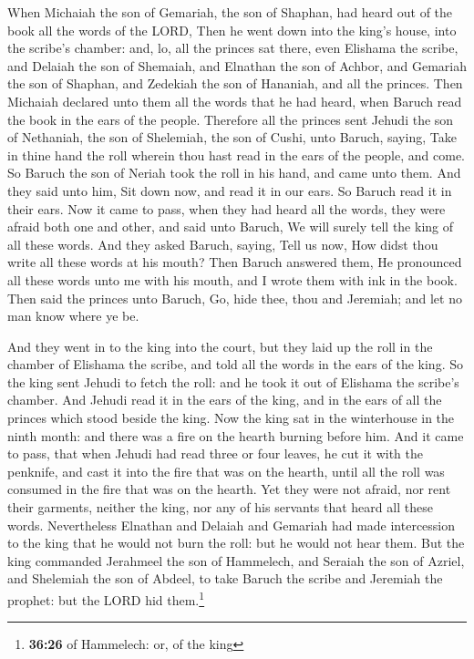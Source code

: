  When Michaiah the son of Gemariah, the son of Shaphan,
had heard out of the book all the words of the LORD, 
Then he went down into the king's house, into the scribe's chamber: and,
lo, all the princes sat there, even Elishama the scribe, and Delaiah the
son of Shemaiah, and Elnathan the son of Achbor, and Gemariah the son of
Shaphan, and Zedekiah the son of Hananiah, and all the princes.
 Then Michaiah declared unto them all the words that he
had heard, when Baruch read the book in the ears of the people.
 Therefore all the princes sent Jehudi the son of
Nethaniah, the son of Shelemiah, the son of Cushi, unto Baruch, saying,
Take in thine hand the roll wherein thou hast read in the ears of the
people, and come. So Baruch the son of Neriah took the roll in his hand,
and came unto them.  And they said unto him, Sit down
now, and read it in our ears. So Baruch read it in their ears.
 Now it came to pass, when they had heard all the words,
they were afraid both one and other, and said unto Baruch, We will
surely tell the king of all these words.  And they asked
Baruch, saying, Tell us now, How didst thou write all these words at his
mouth?  Then Baruch answered them, He pronounced all
these words unto me with his mouth, and I wrote them with ink in the
book.  Then said the princes unto Baruch, Go, hide thee,
thou and Jeremiah; and let no man know where ye be.

 And they went in to the king into the court, but they
laid up the roll in the chamber of Elishama the scribe, and told all the
words in the ears of the king.  So the king sent Jehudi
to fetch the roll: and he took it out of Elishama the scribe's chamber.
And Jehudi read it in the ears of the king, and in the ears of all the
princes which stood beside the king.  Now the king sat in
the winterhouse in the ninth month: and there was a fire on the hearth
burning before him.  And it came to pass, that when
Jehudi had read three or four leaves, he cut it with the penknife, and
cast it into the fire that was on the hearth, until all the roll was
consumed in the fire that was on the hearth.  Yet they
were not afraid, nor rent their garments, neither the king, nor any of
his servants that heard all these words.  Nevertheless
Elnathan and Delaiah and Gemariah had made intercession to the king that
he would not burn the roll: but he would not hear them. 
But the king commanded Jerahmeel the son of Hammelech, and Seraiah the
son of Azriel, and Shelemiah the son of Abdeel, to take Baruch the
scribe and Jeremiah the prophet: but the LORD hid them.\footnote{\textbf{36:26}
  of Hammelech: or, of the king}

